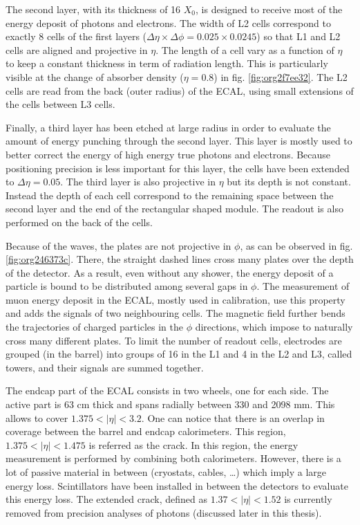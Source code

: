 The second layer, with its thickness of 16 $X_0$, is designed to receive most of the energy deposit of photons and electrons.
The width of L2 cells correspond to exactly 8 cells of the first layers ($\Delta\eta\times\Delta\phi=0.025\times 0.0245$) so that L1 and L2 cells are aligned and projective in $\eta$.
The length of a cell vary as a function of $\eta$ to keep a constant thickness in term of radiation length.
This is particularly visible at the change of absorber density ($\eta=0.8$) in fig. \ref{fig:org2f7ee32}.
The L2 cells are read from the back (outer radius) of the ECAL, using small extensions of the cells between L3 cells.

Finally, a third layer has been etched at large radius in order to evaluate the amount of energy punching through the second layer.
This layer is mostly used to better correct the energy of high energy true photons and electrons.
Because positioning precision is less important for this layer, the cells have been extended to $\Delta\eta=0.05$.
The third layer is also projective in $\eta$ but its depth is not constant.
Instead the depth of each cell correspond to the remaining space between the second layer and the end of the rectangular shaped module.
The readout is also performed on the back of the cells.

Because of the waves, the plates are not projective in $\phi$, as can be observed  in fig.  \ref{fig:org246373c}.
There, the straight dashed lines cross many plates over the depth of the detector.
As a result, even without any shower, the energy deposit of a particle is bound to be distributed among several gaps in $\phi$.
The measurement of muon energy deposit in the ECAL, mostly used in calibration, use this property and adds the signals of two neighbouring cells.
The magnetic field further bends the trajectories of charged particles in the $\phi$ directions, which impose to naturally cross many different plates.
To limit the number of readout cells, electrodes are grouped (in the barrel) into groups of 16 in the L1 and 4 in the L2 and L3, called towers, and their signals are summed together.



The endcap part of the ECAL consists in two wheels, one for each side.
The active part is 63 cm thick and spans radially between 330 and 2098 mm.
This allows to cover $1.375<|\eta|<3.2$.
One can notice that there is an overlap in coverage between the barrel and endcap calorimeters.
This region, $1.375<|\eta|<1.475$ is referred as the crack.
In this region, the energy measurement is performed by combining both calorimeters.
However, there is a lot of passive material in between (cryostats, cables, \ldots{}) which imply a large energy loss.
Scintillators have been installed in between the detectors to evaluate this energy loss.
The extended crack, defined as $1.37<|\eta|<1.52$ is currently removed from precision analyses of photons (discussed later in this thesis).


